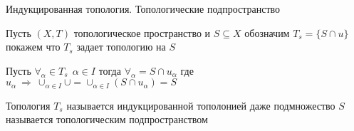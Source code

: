 \begin{title}[\Large]
  Индукцированная топология. Топологические подпространство
\end{title}

Пусть $(X, T)$ топологическое пространство и $S \subseteq X$ обозначим
$T_s = \{ S \cap u\}$ покажем что $T_s$ задает топологию на $S$

Пусть $\forall_{\alpha} \in T_s ~~ \alpha \in I$ тогда $ \forall_{\alpha} = S
\cap u_{\alpha}$ где $u_{\alpha} ~ \Rightarrow ~ \cup_{\alpha \in I} \cup =
\cup_{\alpha \in I}(S \cap u_{\alpha}) = S$

\begin{define}
  Топология $T_s$ называется индукцированной тополонией даже подмножество $S$
  называется топологическим подпространством
\end{define}
